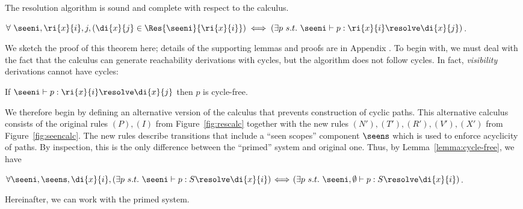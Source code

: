 The resolution algorithm is sound and complete
with respect to the calculus. 
\begin{theorem}
\label{theorem:correctness}
$\forall\ \seeni, \ri{x}{i}, j, (\di{x}{j}\in \Res{\seeni}{\ri{x}{i}}) 
\iff (\exists p\ s.t.\ \seeni \vdash p : \ri{x}{i} \resolve \di{x}{j})$.
\end{theorem}

We sketch the proof of this theorem here; 
details of the supporting lemmas and proofs are in Appendix .
To begin with, we must deal with the fact that the calculus can
generate reachability derivations with cycles,
but the algorithm does not follow cycles.
In fact, \emph{visibility} derivations cannot have cycles: 

\begin{lemma}%
\label{lemma:cycle-free}
If $\seeni \vdash p : \ri{x}{i} \resolve \di{x}{j}$ then $p$ is cycle-free.
\end{lemma}



\noindent
We therefore begin 
by defining an alternative version of the calculus that
prevents construction of cyclic paths.  This alternative calculus 
consists of the original rules $(P),(I)$ from Figure~\ref{fig:rescalc} 
together with the new rules $(N'),(T'),(R'),(V'),(X')$ 
from Figure~\ref{fig:seencalc}.
The new rules describe transitions that include a ``seen scopes'' component $\seens$ which
is used to enforce acyclicity of paths. By inspection, this is the only difference 
between the ``primed'' system and original one.
Thus, by Lemma~\ref{lemma:cycle-free}, we have

\begin{lemma}
\label{lemma:primed}
$\forall\seeni, \seens, \di{x}{i}, (\exists p\ s.t.\ \seeni \vdash p:S \resolve
\di{x}{i})\!\iff\!(\exists p\ s.t.\ \seeni,\emptyset \vdash p:S \resolve \di{x}{i})$.
\end{lemma}

\noindent
Hereinafter, we can work with the primed system.

